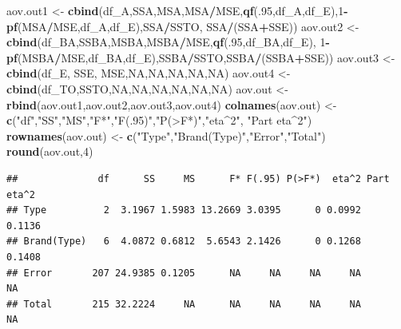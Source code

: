 \documentclass[
]{book}
\newenvironment{Shaded}{\begin{snugshade}}{\end{snugshade}}
\newcommand{\ConstantTok}[1]{\textcolor[rgb]{0.56,0.35,0.01}{#1}}
\newcommand{\DecValTok}[1]{\textcolor[rgb]{0.00,0.00,0.81}{#1}}
\newcommand{\FunctionTok}[1]{\textcolor[rgb]{0.13,0.29,0.53}{\textbf{#1}}}
\newcommand{\NormalTok}[1]{#1}
\newcommand{\OtherTok}[1]{\textcolor[rgb]{0.56,0.35,0.01}{#1}}
\newcommand{\SpecialCharTok}[1]{\textcolor[rgb]{0.81,0.36,0.00}{\textbf{#1}}}
\newcommand{\StringTok}[1]{\textcolor[rgb]{0.31,0.60,0.02}{#1}}
\begin{document}
\begin{Shaded}
\begin{Highlighting}[]
\NormalTok{aov.out1 }\OtherTok{\textless{}{-}} \FunctionTok{cbind}\NormalTok{(df\_A,SSA,MSA,MSA}\SpecialCharTok{/}\NormalTok{MSE,}\FunctionTok{qf}\NormalTok{(.}\DecValTok{95}\NormalTok{,df\_A,df\_E),}\DecValTok{1}\SpecialCharTok{{-}}\FunctionTok{pf}\NormalTok{(MSA}\SpecialCharTok{/}\NormalTok{MSE,df\_A,df\_E),SSA}\SpecialCharTok{/}\NormalTok{SSTO, SSA}\SpecialCharTok{/}\NormalTok{(SSA}\SpecialCharTok{+}\NormalTok{SSE))}
\NormalTok{aov.out2 }\OtherTok{\textless{}{-}} \FunctionTok{cbind}\NormalTok{(df\_BA,SSBA,MSBA,MSBA}\SpecialCharTok{/}\NormalTok{MSE,}\FunctionTok{qf}\NormalTok{(.}\DecValTok{95}\NormalTok{,df\_BA,df\_E),}
                  \DecValTok{1}\SpecialCharTok{{-}}\FunctionTok{pf}\NormalTok{(MSBA}\SpecialCharTok{/}\NormalTok{MSE,df\_BA,df\_E),SSBA}\SpecialCharTok{/}\NormalTok{SSTO,SSBA}\SpecialCharTok{/}\NormalTok{(SSBA}\SpecialCharTok{+}\NormalTok{SSE))}
\NormalTok{aov.out3 }\OtherTok{\textless{}{-}} \FunctionTok{cbind}\NormalTok{(df\_E, SSE, MSE,}\ConstantTok{NA}\NormalTok{,}\ConstantTok{NA}\NormalTok{,}\ConstantTok{NA}\NormalTok{,}\ConstantTok{NA}\NormalTok{,}\ConstantTok{NA}\NormalTok{)}
\NormalTok{aov.out4 }\OtherTok{\textless{}{-}} \FunctionTok{cbind}\NormalTok{(df\_TO,SSTO,}\ConstantTok{NA}\NormalTok{,}\ConstantTok{NA}\NormalTok{,}\ConstantTok{NA}\NormalTok{,}\ConstantTok{NA}\NormalTok{,}\ConstantTok{NA}\NormalTok{,}\ConstantTok{NA}\NormalTok{)}
\NormalTok{aov.out }\OtherTok{\textless{}{-}} \FunctionTok{rbind}\NormalTok{(aov.out1,aov.out2,aov.out3,aov.out4)}
\FunctionTok{colnames}\NormalTok{(aov.out) }\OtherTok{\textless{}{-}} \FunctionTok{c}\NormalTok{(}\StringTok{"df"}\NormalTok{,}\StringTok{"SS"}\NormalTok{,}\StringTok{"MS"}\NormalTok{,}\StringTok{"F*"}\NormalTok{,}\StringTok{"F(.95)"}\NormalTok{,}\StringTok{"P(\textgreater{}F*)"}\NormalTok{,}\StringTok{"eta\^{}2"}\NormalTok{, }\StringTok{"Part eta\^{}2"}\NormalTok{)}
\FunctionTok{rownames}\NormalTok{(aov.out) }\OtherTok{\textless{}{-}} \FunctionTok{c}\NormalTok{(}\StringTok{"Type"}\NormalTok{,}\StringTok{"Brand(Type)"}\NormalTok{,}\StringTok{"Error"}\NormalTok{,}\StringTok{"Total"}\NormalTok{)}
\FunctionTok{round}\NormalTok{(aov.out,}\DecValTok{4}\NormalTok{)}
\end{Highlighting}
\end{Shaded}

\begin{verbatim}
##              df      SS     MS      F* F(.95) P(>F*)  eta^2 Part eta^2
## Type          2  3.1967 1.5983 13.2669 3.0395      0 0.0992     0.1136
## Brand(Type)   6  4.0872 0.6812  5.6543 2.1426      0 0.1268     0.1408
## Error       207 24.9385 0.1205      NA     NA     NA     NA         NA
## Total       215 32.2224     NA      NA     NA     NA     NA         NA
\end{verbatim}
\end{document}
